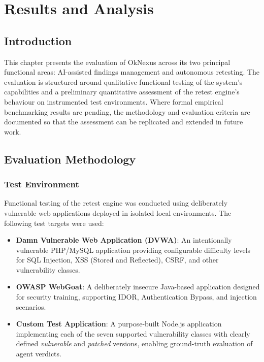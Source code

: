 \chapter{Results and Analysis}

\section{Introduction}

This chapter presents the evaluation of OkNexus across its two principal functional areas: AI-assisted findings management and autonomous retesting. The evaluation is structured around qualitative functional testing of the system's capabilities and a preliminary quantitative assessment of the retest engine's behaviour on instrumented test environments. Where formal empirical benchmarking results are pending, the methodology and evaluation criteria are documented so that the assessment can be replicated and extended in future work.

\section{Evaluation Methodology}

\subsection{Test Environment}

Functional testing of the retest engine was conducted using deliberately vulnerable web applications deployed in isolated local environments. The following test targets were used:

\begin{itemize}
    \item \textbf{Damn Vulnerable Web Application (DVWA)}: An intentionally vulnerable PHP/MySQL application providing configurable difficulty levels for SQL Injection, XSS (Stored and Reflected), CSRF, and other vulnerability classes.

    \item \textbf{OWASP WebGoat}: A deliberately insecure Java-based application designed for security training, supporting IDOR, Authentication Bypass, and injection scenarios.

    \item \textbf{Custom Test Application}: A purpose-built Node.js application implementing each of the seven supported vulnerability classes with clearly defined \textit{vulnerable} and \textit{patched} versions, enabling ground-truth evaluation of agent verdicts.
\end{itemize}

